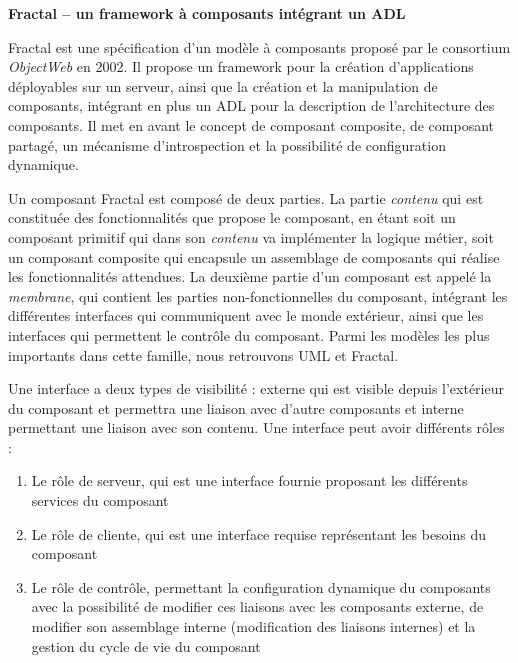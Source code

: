         \textbf{Fractal -- un framework à composants intégrant un ADL}
        
        Fractal \cite{DBLP:journals/spe/BrunetonCLQS06} est une spécification d'un modèle à composants proposé par le consortium \emph{ObjectWeb} en 2002. Il propose un framework pour la création d'applications déployables sur un serveur, ainsi que la création et la manipulation de composants, intégrant en plus un ADL pour la description de l'architecture des composants. Il met en avant le concept de composant composite, de composant partagé, un mécanisme d'introspection et la possibilité de configuration dynamique. 
        
        Un composant Fractal est composé de deux parties. La partie \emph{contenu} qui est consti\-tuée des fonctionnalités que propose le composant, en étant soit un composant primitif qui dans son \emph{contenu} va implémenter la logique métier, soit un composant composite qui encapsule un assemblage de composants qui réalise les fonctionnalités attendues. La deuxième partie d'un composant est appelé la \emph{membrane}, qui contient les parties non-fonctionnelles du composant, intégrant les différentes interfaces qui communiquent avec le monde extérieur, ainsi que les interfaces qui permettent le contrôle du composant. Parmi les modèles les plus importants dans cette famille, nous retrouvons UML et Fractal. \\\par
        
        Une interface a deux types de visibilité : externe qui est visible depuis l’extérieur du composant et permettra une liaison avec d'autre composants et interne permettant une liaison avec son contenu. Une interface peut avoir différents rôles :
        
        \begin{enumerate}
        
          \item Le rôle de serveur, qui est une interface fournie proposant les différents services du composant
          
          \item Le rôle de cliente, qui est une interface requise représentant les besoins du composant
          
          \item Le rôle de contrôle, permettant la configuration dynamique du composants avec la possibilité de modifier ces liaisons avec les composants externe, de modifier son assemblage interne (modification des liaisons internes) et la gestion du cycle de vie du composant
        
        \end{enumerate}
        
